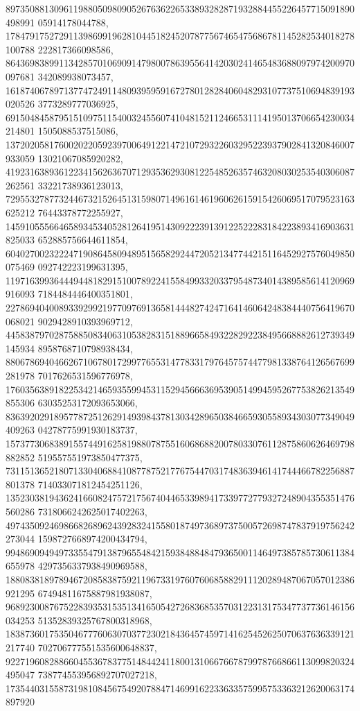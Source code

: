 \documentclass[12pt]{article}
\begin{document}
897350881309611988050980905267636226533893282871932884455226457715091890498991
05914178044788, 
178479175272911398699196281044518245207877567465475686781145282534018278100788
222817366098586, 
864369838991134285701069091479800786395564142030241465483688097974200970097681
342089938073457, 
161874067897137747249114809395959167278012828406048293107737510694839193020526
3773289777036925, 
691504845879515109751154003245560741048152112466531114195013706654230034214801
1505088537515086, 
137202058176002022059239700649122147210729322603295223937902841320846007933059
13021067085920282, 
419231638936122341562636707129353629308122548526357463208030253540306087262561
33221738936123013, 
729553278773244673215264513159807149616146196062615915426069517079523163625212
76443378772255927, 
145910555664658934534052812641951430922239139122522283184223893416903631825033
652885756644611854, 
604027002322247190864580948951565829244720521347744215116452927576049850075469
092742223199631395, 
119716399364449448182915100789224155849933203379548734014389585614120969916093
7184484446400351801, 
227869404008933929921977097691365814448274247164146064248384440756419670068021
9029428910393969712, 
445838797028758850834063105382831518896658493228292238495668882612739349145934
8958768710798938434, 
880678694046626710678017299776553147783317976457574477981338764126567699281978
7017626531596776978, 
176035638918225342146593559945311529456663695390514994595267753826213549855306
63035253172093653066, 
836392029189577872512629149398437813034289650384665930558934303077349049409263
04278775991930183737, 
157377306838915574491625819880787551606868820078033076112875860626469798882852
519557551973850477375, 
731151365218071330406884108778752177675447031748363946141744466782256887801378
714033071812454251126, 
135230381943624166082475721756740446533989417339772779327248904355351476560286
7318066242625017402263, 
497435092469866826896243928324155801874973689737500572698747837919756242273044
1598727668974200434794, 
994869094949733554791387965548421593848848479365001146497385785730611384655978
4297356337938490969588, 
188083818978946720858387592119673319760760685882911120289487067057012386921295
67494811675887981938087, 
968923008767522839353153513416505427268368535703122313175347737736146156034253
51352839325767800318968, 
183873601753504677760630703772302184364574597141625452625070637636339121217740
702706777551535600648837, 
922719608288660455367837751484424118001310667667879978766866113099820324495047
738774553956892707027218, 
173544031558731981084567549207884714699162233633575995753363212620063174897920
\end{document}
